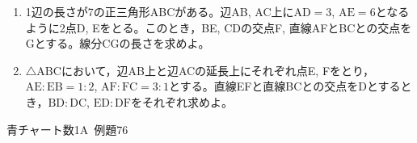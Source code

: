 \documentclass[b4paper, dvipdfmx, 11pt, fleqn, twocolumn, uplatex]{jsarticle}
\begin{document}

\begin{screen}
\begin{enumerate}[label={(\arabic*)}]
\item 1辺の長さが7の正三角形ABCがある。辺AB, AC上に$\mathrm{AD}=3$, $\mathrm{AE}=6$となるように2点D, Eをとる。このとき，BE, CDの交点F, 直線AFとBCとの交点をGとする。線分CGの長さを求めよ。
\item $\triangle{\mathrm{ABC}}$において，辺AB上と辺ACの延長上にそれぞれ点E, Fをとり，$\mathrm{AE}:\mathrm{EB}=1:2$, $\mathrm{AF}:\mathrm{FC}=3:1$とする。直線EFと直線BCとの交点をDとするとき，$\mathrm{BD}:\mathrm{DC}$, $\mathrm{ED}:\mathrm{DF}$をそれぞれ求めよ。
\end{enumerate}
\begin{flushright}
    青チャート数1A~例題76
\end{flushright}
\end{screen}

\end{document}
